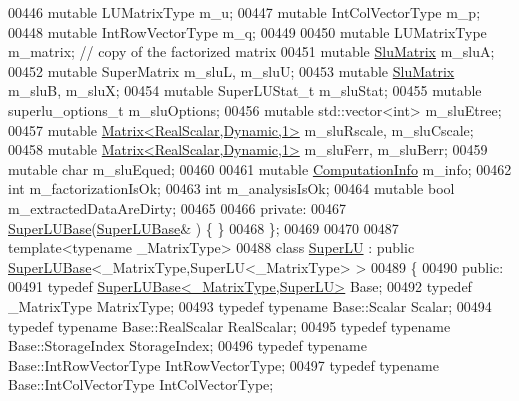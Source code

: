 \begin{DoxyCode}
00446     \textcolor{keyword}{mutable} LUMatrixType m\_u;
00447     \textcolor{keyword}{mutable} IntColVectorType m\_p;
00448     \textcolor{keyword}{mutable} IntRowVectorType m\_q;
00449 
00450     \textcolor{keyword}{mutable} LUMatrixType m\_matrix;  \textcolor{comment}{// copy of the factorized matrix}
00451     \textcolor{keyword}{mutable} \hyperlink{struct_eigen_1_1_slu_matrix}{SluMatrix} m\_sluA;
00452     \textcolor{keyword}{mutable} SuperMatrix m\_sluL, m\_sluU;
00453     \textcolor{keyword}{mutable} \hyperlink{struct_eigen_1_1_slu_matrix}{SluMatrix} m\_sluB, m\_sluX;
00454     \textcolor{keyword}{mutable} SuperLUStat\_t m\_sluStat;
00455     \textcolor{keyword}{mutable} superlu\_options\_t m\_sluOptions;
00456     \textcolor{keyword}{mutable} std::vector<int> m\_sluEtree;
00457     \textcolor{keyword}{mutable} \hyperlink{group___core___module}{Matrix<RealScalar,Dynamic,1>} m\_sluRscale, m\_sluCscale;
00458     \textcolor{keyword}{mutable} \hyperlink{group___core___module}{Matrix<RealScalar,Dynamic,1>} m\_sluFerr, m\_sluBerr;
00459     \textcolor{keyword}{mutable} \textcolor{keywordtype}{char} m\_sluEqued;
00460 
00461     \textcolor{keyword}{mutable} \hyperlink{group__enums_ga85fad7b87587764e5cf6b513a9e0ee5e}{ComputationInfo} m\_info;
00462     \textcolor{keywordtype}{int} m\_factorizationIsOk;
00463     \textcolor{keywordtype}{int} m\_analysisIsOk;
00464     \textcolor{keyword}{mutable} \textcolor{keywordtype}{bool} m\_extractedDataAreDirty;
00465     
00466   \textcolor{keyword}{private}:
00467     \hyperlink{class_eigen_1_1_super_l_u_base}{SuperLUBase}(\hyperlink{class_eigen_1_1_super_l_u_base}{SuperLUBase}& ) \{ \}
00468 \};
00469 
00470 
00487 \textcolor{keyword}{template}<\textcolor{keyword}{typename} \_MatrixType>
00488 \textcolor{keyword}{class }\hyperlink{class_eigen_1_1_super_l_u}{SuperLU} : \textcolor{keyword}{public} \hyperlink{class_eigen_1_1_super_l_u_base}{SuperLUBase}<\_MatrixType,SuperLU<\_MatrixType> >
00489 \{
00490   \textcolor{keyword}{public}:
00491     \textcolor{keyword}{typedef} \hyperlink{class_eigen_1_1_super_l_u_base}{SuperLUBase<\_MatrixType,SuperLU>} Base;
00492     \textcolor{keyword}{typedef} \_MatrixType MatrixType;
00493     \textcolor{keyword}{typedef} \textcolor{keyword}{typename} Base::Scalar Scalar;
00494     \textcolor{keyword}{typedef} \textcolor{keyword}{typename} Base::RealScalar RealScalar;
00495     \textcolor{keyword}{typedef} \textcolor{keyword}{typename} Base::StorageIndex StorageIndex;
00496     \textcolor{keyword}{typedef} \textcolor{keyword}{typename} Base::IntRowVectorType IntRowVectorType;
00497     \textcolor{keyword}{typedef} \textcolor{keyword}{typename} Base::IntColVectorType IntColVectorType;   

\end{DoxyCode}
